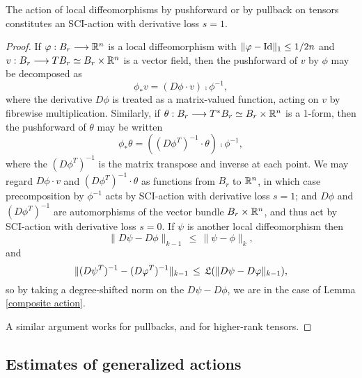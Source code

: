 \documentclass{article}
\begin{document}
\begin{lem}\label{pushforward and pullback are SCI}
The action of local diffeomorphisms by pushforward or by pullback on tensors constitutes an SCI-action with derivative loss $s=1$.
\end{lem}
\begin{proof}
If $\varphi:B_r\longrightarrow\mathbb R^n$ is a local diffeomorphism with $\|\varphi-\textrm{Id}\|_1\leq1/2n$ and $v:B_r \longrightarrow TB_r \simeq B_r\times\mathbb R^n$ is a vector field, then the pushforward of $v$ by $\phi$ may be decomposed as
$$\phi_*v = (D\phi\cdot v)\comp\phi^{-1},$$
where the derivative $D\phi$ is treated as a matrix-valued function, acting on $v$ by fibrewise multiplication.  Similarly, if $\theta:B_r \longrightarrow T^*B_r \simeq B_r\times\mathbb R^n$ is a 1-form, then the pushforward of $\theta$ may be written
$$\phi_*\theta = ((D\phi^T)^{-1}\cdot\theta)\comp\phi^{-1},$$
where the $(D\phi^T)^{-1}$ is the matrix transpose and inverse at each point.  We may regard $D\phi\cdot v$ and $(D\phi^T)^{-1}\cdot\theta$ as functions from $B_r$ to $\mathbb R^n$, in which case precomposition by $\phi^{-1}$ acts by SCI-action with derivative loss $s=1$; and $D\phi$ and $(D\phi^T)^{-1}$ are automorphisms of the vector bundle $B_r \times \mathbb R^n$, and thus act by SCI-action with derivative loss $s=0$.  If $\psi$ is another local diffeomorphism then
$$\|D\psi-D\phi\|_{k-1} \,\leq\, \|\psi-\phi\|_k,$$
and
$$\|(D\psi^T)^{-1}-(D\varphi^T)^{-1}\|_{k-1}  \,\leq\, \mathfrak{L}(\|D\psi-D\varphi\|_{k-1}),$$
so by taking a degree-shifted norm on the $D\psi-D\phi$, we are in the case of Lemma \ref{composite action}.

A similar argument works for pullbacks, and for higher-rank tensors.
\end{proof}


\subsection{Estimates of generalized actions}
\end{document}
